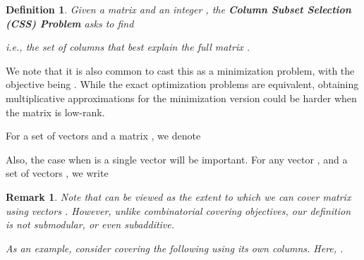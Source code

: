 \documentclass{article}
\newtheorem{defin}{Definition}\newtheorem{thm}{Theorem}\newtheorem{exe}{Exercise}\newtheorem{exa}{Example}\newtheorem{fact}{Fact}\newtheorem{prop}{Proposition}\newtheorem{lemma}{Lemma}\newtheorem{corol}{Corollary}\newtheorem{conj}{Conjecture}\newtheorem{remark}{Remark}\newtheorem{discussion}{Discussion}\newtheorem{conc}{Conclusion}
\begin{document}
\iffalse
{\bf Submodular optimization.}  Given a finite set  and a set function , define the marginal gain of adding an element  to a set  by .  is said to be submodular if  for any subsets  and any element . This is a formalization of the well-known economic principle of decreasing marginal utility.  is further said to be nonnegative if  for any , and monotonically nondecreasing if  for any . The theory of maximizing submodular functions subject to a cardinality constraint has been well studied, and has been shown to be NP-hard [Nemhauser and
Wolsey 1978; Feige 1998]. However, it is a key result in combinatorial optimization that a simple greedy algorithm to this problem for nonnegative, monotone nondecreasing submodular functions admits a  constant factor approximation [Nemhauser '78].
\fi

\begin{defin}\label{defn:css-problem}
Given a matrix  and an integer , the \textbf{Column Subset Selection (CSS) Problem} asks to find

i.e., the set of columns that {\em best explain} the full matrix .
\end{defin}

We note that it is also common to cast this as a minimization problem, with the objective being . While the exact optimization problems are equivalent, obtaining multiplicative approximations for the minimization version could be harder when the matrix is low-rank.

For a set of vectors  and a matrix , we denote

\iffalse
In this article, instead of minimizing the unexplained (error) part  of , we maximize the explained part  of . Formally,

Thus, a subset of columns that maximizes explanation of  will also minimized the unexplained error.
\fi
Also, the case when  is a single vector will be important. For any vector , and a set of vectors , we write


\begin{remark} \label{rem:not-submodular} Note that  can be viewed as the extent to which we can {\em cover} matrix  using vectors .  However, unlike combinatorial covering objectives, our definition is not submodular, or even subadditive.
\iffalse
\begin{defin} \label{f definition matrix}
Given , define the function:  by:  over the columns  of . 
\end{defin}
\fi
As an example, consider covering the following  using its own columns. Here, .

\end{remark}
\end{document}
